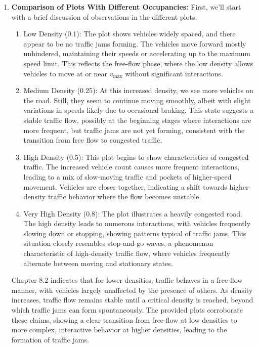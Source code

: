 \documentclass{article}
\begin{document}
\begin{enumerate}
    \item 
    \textbf{Comparison of Plots With Different Occupancies: } 
    First, we'll start with a brief discussion of observations in the different plots: 
    \begin{enumerate}
        \item 
        Low Density (0.1): The plot shows vehicles widely spaced, and there appear to be no traffic jams forming. The vehicles move forward mostly unhindered, maintaining their speeds or accelerating up to the maximum speed limit. This reflects the free-flow phase, where the low density allows vehicles to move at or near $v_\text{max}$ without significant interactions.

        \item
        Medium Density (0.25): At this increased density, we see more vehicles on the road. Still, they seem to continue moving smoothly, albeit with slight variations in speeds likely due to occasional braking. This state suggests a stable traffic flow, possibly at the beginning stages where interactions are more frequent, but traffic jams are not yet forming, consistent with the transition from free flow to congested traffic.

        \item
        High Density (0.5): This plot begins to show characteristics of congested traffic. The increased vehicle count causes more frequent interactions, leading to a mix of slow-moving traffic and pockets of higher-speed movement. Vehicles are closer together, indicating a shift towards higher-density traffic behavior where the flow becomes unstable.

        \item
        Very High Density (0.8): The plot illustrates a heavily congested road. The high density leads to numerous interactions, with vehicles frequently slowing down or stopping, showing patterns typical of traffic jams. This situation closely resembles stop-and-go waves, a phenomenon characteristic of high-density traffic flow, where vehicles frequently alternate between moving and stationary states.
    \end{enumerate}

    Chapter 8.2 indicates that for lower densities, traffic behaves in a free-flow manner, with vehicles largely unaffected by the presence of others. As density increases, traffic flow remains stable until a critical density is reached, beyond which traffic jams can form spontaneously. The provided plots corroborate these claims, showing a clear transition from free-flow at low densities to more complex, interactive behavior at higher densities, leading to the formation of traffic jams. 


\end{enumerate}
\end{document}
